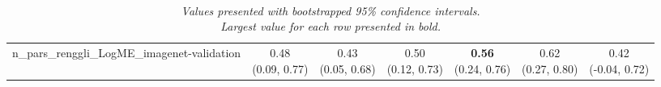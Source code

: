 \begin{table}[H]
\begin{tabular}{c|cccccc}
\hline
n_pars_renggli_LogME_imagenet-validation & \makecell{0.48 \\[0pt] (0.09, 0.77)} & \makecell{0.43 \\[0pt] (0.05, 0.68)} & \makecell{0.50 \\[0pt] (0.12, 0.73)} & \makecell{\textbf{0.56} \\[0pt] (0.24, 0.76)} & \makecell{0.62 \\[0pt] (0.27, 0.80)} & \makecell{0.42 \\[0pt] (-0.04, 0.72)} \\
\end{tabular}
\caption*{\\\textit{Values presented with bootstrapped 95\% confidence intervals.\\
Largest value for each row presented in bold.}}
\end{table}
